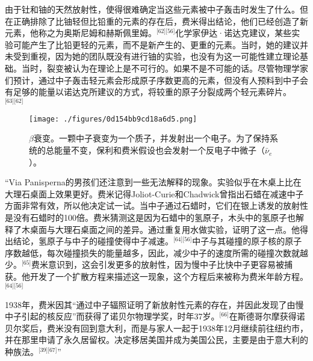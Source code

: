 由于钍和铀的天然放射性，使得很难确定当这些元素被中子轰击时发生了什么。但在正确排除了比铀轻但比铅重的元素的存在后，费米得出结论，他们已经创造了新元素，他称之为奥斯尼姆和赫斯佩里姆。\(^\text{[62][56]}\)化学家伊达·诺达克建议，某些实验可能产生了比铅更轻的元素，而不是新产生的、更重的元素。当时，她的建议并未受到重视，因为她的团队既没有进行铀的实验，也没有为这一可能性建立理论基础。当时，裂变被认为在理论上是不可行的。如果不是不可能的话。尽管物理学家们预计，通过中子轰击轻元素会形成原子序数更高的元素，但没有人预料到中子会有足够的能量以诺达克所建议的方式，将较重的原子分裂成两个轻元素碎片。\(^\text{[63][62]}\)
\begin{figure}[ht]
\centering
\texttt{[image: ./figures/0d154bb9cd18a6d5.png]}
\caption{$\beta$衰变。一颗中子衰变为一个质子，并发射出一个电子。为了保持系统的总能量不变，保利和费米假设也会发射一个反电子中微子（${\displaystyle {\bar {\nu }}_{e}}$）。} \label{fig_ELK_6}
\end{figure}
“Via Panisperna的男孩们还注意到一些无法解释的现象。实验似乎在木桌上比在大理石桌面上效果更好。费米记得Joliot-Curie和Chadwick曾指出石蜡在减速中子方面非常有效，所以他决定试一试。当中子通过石蜡时，它们在银上诱发的放射性是没有石蜡时的100倍。费米猜测这是因为石蜡中的氢原子，木头中的氢原子也解释了木桌面与大理石桌面之间的差异。通过重复用水做实验，证明了这一点。他得出结论，氢原子与中子的碰撞使得中子减速。\(^\text{[64][56]}\)中子与其碰撞的原子核的原子序数越低，每次碰撞损失的能量越多，因此，减少中子的速度所需的碰撞次数就越少。\(^\text{[65]}\)费米意识到，这会引发更多的放射性，因为慢中子比快中子更容易被捕获。他开发了一个扩散方程来描述这一现象，这个方程后来被称为费米年龄方程。\(^\text{[64][56]}\)

1938年，费米因其“通过中子辐照证明了新放射性元素的存在，并因此发现了由慢中子引起的核反应”而获得了诺贝尔物理学奖，时年37岁。\(^\text{[66]}\)在斯德哥尔摩获得诺贝尔奖后，费米没有回到意大利，而是与家人一起于1938年12月继续前往纽约市，并在那里申请了永久居留权。决定移居美国并成为美国公民，主要是由于意大利的种族法。\(^\text{[39][67]}\)”

